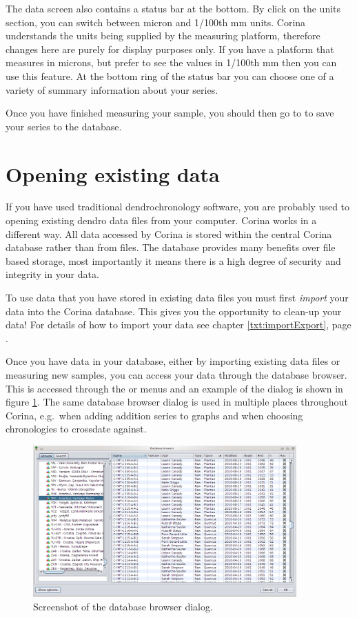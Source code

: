 The data screen also contains a status bar at the bottom. By click on the units section, you can switch between micron and 1/100th mm units. Corina understands the units being supplied by the measuring platform, therefore changes here are purely for display purposes only. If you have a platform that measures in microns, but prefer to see the values in 1/100th mm then you can use this feature. At the bottom ring of the status bar you can choose one of a variety of summary information about your series.

Once you have finished measuring your sample, you should then go to  to save your series to the database. 


\section{Opening existing data}
If you have used traditional dendrochronology software, you are probably used to opening existing dendro data files from your computer.  Corina works in a different way.  All data accessed by Corina is stored within the central Corina database rather than from files.  The database provides many benefits over file based storage, most importantly it means there is a high degree of security and integrity in your data.  

To use data that you have stored in existing data files you must first \emph{import} your data into the Corina database.  This gives you the opportunity to clean-up your data!  For details of how to import your data see chapter \ref{txt:importExport}, page \pageref{txt:importExport}.

Once you have data in your database, either by importing existing data files or measuring new samples, you can access your data through the database browser.  This is accessed through the  or  menus and an example of the dialog is shown in figure \ref{fig:dbbrowser}. The same database browser dialog is used in multiple places throughout Corina, e.g.\ when adding addition series to graphs and when choosing chronologies to crossdate against. 

\begin{figure}[hbtp]
  \centering
    \includegraphics[width=0.9\textwidth]{Images/dbbrowser.png}
    \caption{Screenshot of the database browser dialog.}
    \label{fig:dbbrowser}
\end{figure}

